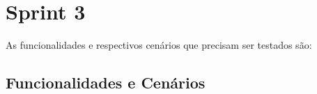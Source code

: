 \chapter{Sprint 3}

As funcionalidades e respectivos cenários que precisam ser testados são:

\section{Funcionalidades e Cenários}










